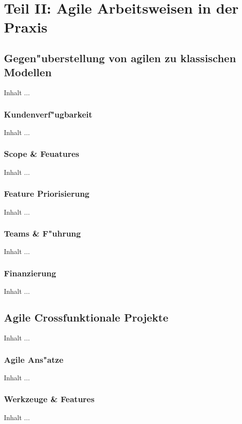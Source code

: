 
\chapter{Teil II: Agile Arbeitsweisen in der Praxis}
\minitoc 
\vspace{1 cm} 

\section{Gegen"uberstellung von agilen zu klassischen Modellen}
Inhalt ...

\subsection{Kundenverf"ugbarkeit}
Inhalt ...


\subsection{Scope \& Feuatures}
Inhalt ...

\subsection{Feature Priorisierung}
Inhalt ...

\subsection{Teams \& F"uhrung}
Inhalt ...

\subsection{Finanzierung}
Inhalt ...


\section{Agile Crossfunktionale Projekte}
Inhalt ...

\subsection{Agile Ans"atze}
Inhalt ...

\subsection{Werkzeuge \& Features}
Inhalt ...
